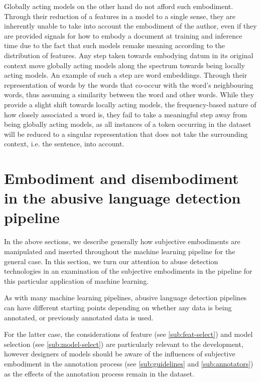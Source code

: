 Globally acting models on the other hand do not afford such embodiment. Through their reduction of a features in a model to a single sense, they are inherently unable to take into account the embodiment of the author, even if they are provided signals for how to embody a document at training and inference time due to the fact that such models remake meaning according to the distribution of features. Any step taken towards embodying datum in its original context move globally acting models along the spectrum towards being locally acting models. An example of such a step are word embeddings. Through their representation of words by the words that co-occur with the word's neighbouring words, thus assuming a similarity between the word and other words. While they provide a slight shift towards locally acting models, the frequency-based nature of how closely associated a word is, they fail to take a meaningful step away from being globally acting models, as all instances of a token occurring in the dataset will be reduced to a singular representation that does not take the surrounding context, i.e. the sentence, into account.

\section{Embodiment and disembodiment in the abusive language detection pipeline}
In the above sections, we describe generally how subjective embodiments are manipulated and inserted throughout the machine learning pipeline for the general case. In this section, we turn our attention to abuse detection technologies in an examination of the subjective embodiments in the pipeline for this particular application of machine learning.\vspace{5mm}

As with many machine learning pipelines, abusive language detection pipelines can have different starting points depending on whether any data is being annotated, or previously annotated data is used.

For the latter case, the considerations of feature (see \autoref{sub:feat-select}) and model selection (see \autoref{sub:model-select}) are particularly relevant to the development, however designers of models should be aware of the influences of subjective embodiment in the annotation process (see \autoref{sub:guidelines} and \autoref{sub:annotators}) as the effects of the annotation process remain in the dataset.\vspace{5mm}

